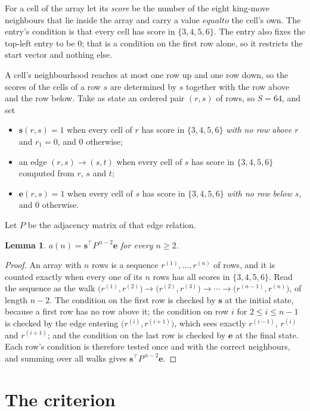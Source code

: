 \documentclass[11pt,a4paper]{article}
\theoremstyle{plain}
\newtheorem{lemma}[theorem]{Lemma}
\theoremstyle{definition}
\begin{document}
For a cell of the array let its \emph{score} be the number of the eight king-move neighbours that lie inside
the array and carry a value $equal to$ the cell's own. The entry's condition is that every cell
has score in $\{3,4,5,6\}$. The entry also fixes the top-left entry to be $0$; that is a condition on the first row alone, so it restricts the start vector and nothing else.

A cell's neighbourhood reaches at most one row up and one row down, so the scores of the
cells of a row $s$ are determined by $s$ together with the row above and the row below.
Take as state an ordered pair $(r,s)$ of rows, so $S=64$, and set
\begin{itemize}
\item $\mathbf{s}(r,s)=1$ when every cell of $r$ has score in $\{3,4,5,6\}$ \emph{with no row
above $r$} and $r_1=0$, and $0$ otherwise;
\item an edge $(r,s)\to(s,t)$ when every cell of $s$ has score in $\{3,4,5,6\}$ computed from
$r$, $s$ and $t$;
\item $\mathbf{e}(r,s)=1$ when every cell of $s$ has score in $\{3,4,5,6\}$ \emph{with no row
below $s$}, and $0$ otherwise.
\end{itemize}
Let $P$ be the adjacency matrix of that edge relation.

\begin{lemma}\label{lem:walk}
$a(n)=\mathbf{s}^{\!\top}P^{\,n-2}\mathbf{e}$ for every $n\ge2$.
\end{lemma}

\begin{proof}
An array with $n$ rows is a sequence $r^{(1)},\dots,r^{(n)}$ of rows, and it is counted
exactly when every one of its $n$ rows has all scores in $\{3,4,5,6\}$. Read the sequence as the
walk $\bigl(r^{(1)},r^{(2)}\bigr)\to\bigl(r^{(2)},r^{(3)}\bigr)\to\cdots\to
\bigl(r^{(n-1)},r^{(n)}\bigr)$, of length $n-2$. The condition on the first row is
checked by $\mathbf{s}$ at the initial state, because a first row has no row above it; the
condition on row $i$ for $2\le i\le n-1$ is checked by the edge entering
$\bigl(r^{(i)},r^{(i+1)}\bigr)$, which sees exactly $r^{(i-1)}$, $r^{(i)}$ and
$r^{(i+1)}$; and the condition on the last row is checked by $\mathbf{e}$ at the final
state. Each row's condition is therefore tested once and with the correct neighbours, and
summing over all walks gives $\mathbf{s}^{\!\top}P^{\,n-2}\mathbf{e}$.
\end{proof}

\section{The criterion}
\end{document}
